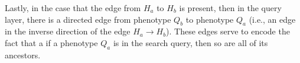 Lastly, in the case that the edge from $H_a$ to $H_b$ is present, then  in the
query layer, there is a directed edge from phenotype $Q_b$ to phenotype $Q_a$ (i.e., an edge in the
inverse direction of the edge $H_a \to H_b$).
%
These edges serve to encode the fact that a if a phenotype $Q_a$ is in the search query, then so are all of its ancestors.
%
\begin{center}
\begin{figure}[h]
\newcommand{\itemlayer}{$I_1$/A, $I_2$/B}
\newcommand{\hiddenquerylayers}{$H_1$/C/$Q_1$/J, $H_2$/D/$Q_2$/K, $H_3$/E/$Q_3$/L, $H_4$/F/$Q_4$/M, $H_5$/G/$Q_5$/N, $H_6$/H/$Q_6$/O, $H_7$/I/$Q_7$/P}
%
    \label{fig:bauer-net}
\end{figure}
\end{center}
